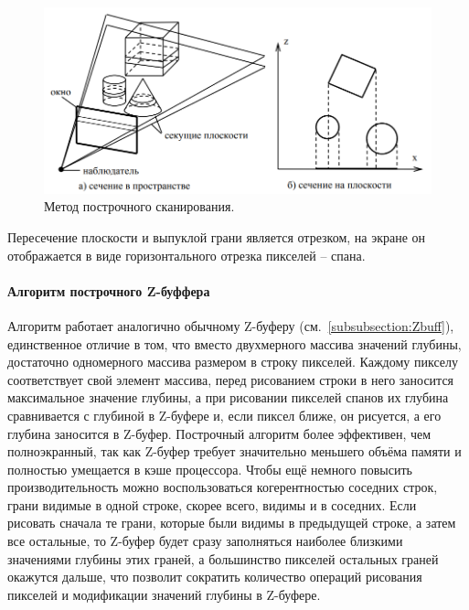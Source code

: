 \begin{figure}[H]
    \centering
    \includegraphics[width=\textwidth]{img/string_algorithms_1.png}
    \caption{Метод построчного сканирования.}
    \label{fig:string_algorithms_1}
\end{figure}

Пересечение плоскости и выпуклой грани является отрезком, на экране он отображается в виде горизонтального отрезка пикселей -- спана.~\cite{polski}


\paragraph{Алгоритм построчного Z-буффера}

\hspace{1.25cm}
Алгоритм работает аналогично обычному Z-буферу (см.~\autoref{subsubsection:Zbuff}),
единственное отличие в том, что вместо двухмерного массива значений
глубины, достаточно одномерного массива размером в строку пикселей.
Каждому пикселу соответствует свой элемент массива, перед рисованием
строки в него заносится максимальное значение глубины, а при рисовании
пикселей спанов их глубина сравнивается с глубиной в Z-буфере и, если
пиксел ближе, он рисуется, а его глубина заносится в Z-буфер. Построчный алгоритм более эффективен, чем полноэкранный, так как Z-буфер требует значительно меньшего объёма памяти и полностью умещается в кэше процессора. Чтобы ещё немного повысить производительность можно воспользоваться когерентностью соседних строк, грани видимые в одной строке, скорее всего, видимы и в соседних. Если рисовать сначала те
грани, которые были видимы в предыдущей строке, а затем все остальные,
то Z-буфер будет сразу заполняться наиболее близкими значениями глубины этих граней, а большинство пикселей остальных граней окажутся
дальше, что позволит сократить количество операций рисования пикселей
и модификации значений глубины в Z-буфере.~\cite{polski}


